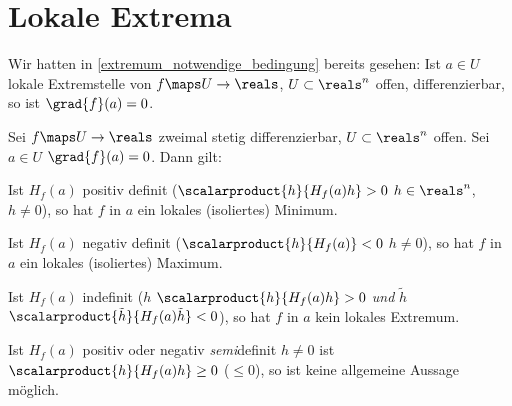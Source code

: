 \section{Lokale Extrema}
Wir hatten in \ref{extremum_notwendige_bedingung} bereits gesehen: Ist \( a\in U \) lokale Extremstelle von \( f\maps U\to \reals \), \( U\subset \reals^n \) offen, differenzierbar, so ist \( \grad{f}(a)=0 \).
\begin{satz}\label{hinreichende_bedingung_isoliertes_extremum}
  Sei \( f\maps U\to \reals \) zweimal stetig differenzierbar, \( U\subset \reals^n \) offen. Sei \( a\in U \) \sd \( \grad{f}(a)=0 \). Dann gilt:
  \begin{eigenschaftenenumerate}
    \item\label{hinreichende_bedingung_isoliertes_minimum} Ist \( H_f(a) \) positiv definit (\dh \( \scalarproduct{h}{H_f(a)h}>0 \) \tforall \( h\in \reals^n \), \( h\neq 0 \)), so hat \( f \) in \( a \) ein lokales (isoliertes) Minimum.
    \item\label{hinreichende_bedingung_isoliertes_maximum} Ist \( H_f(a) \) negativ definit (\dh \( \scalarproduct{h}{H_f(a)}<0 \) \tforall \( h\neq 0 \)), so hat \( f \) in \( a \) ein lokales (isoliertes) Maximum.
    \item\label{hinreichende_bedingung_kein_extremum} Ist \( H_f(a) \) indefinit (\dh \texists  \( h \) \sd \( \scalarproduct{h}{H_f(a)h}>0 \) \emph{und} \texists \( \tilde{h} \) \sd \( \scalarproduct{\tilde{h}}{H_f(a)\tilde{h}}<0 \)), so hat \( f \) in \( a \) kein lokales Extremum.
  \end{eigenschaftenenumerate}
\end{satz}
\begin{bemerkung*}
  Ist \( H_f(a) \) positiv oder negativ \emph{semi}definit \sd \tforall \( h\neq 0 \) ist \( \scalarproduct{h}{H_f(a)h}\geq 0 \) (\bzw \( \leq 0 \)), so ist keine allgemeine Aussage möglich.
\end{bemerkung*}
